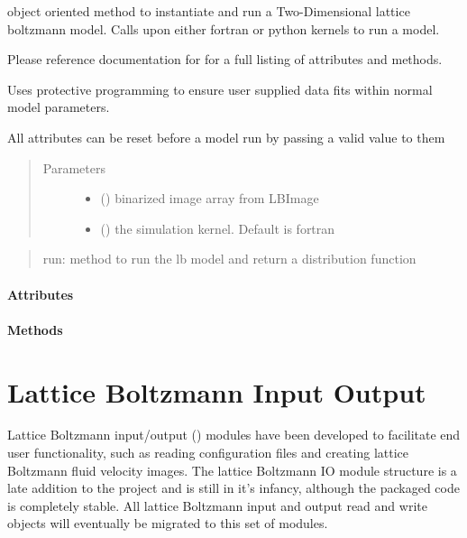 \documentclass[letterpaper,10pt,english]{sphinxmanual}
\begin{document}
\begin{fulllineitems}
\label{\detokenize{index:lb_colloids.LB2DModel}}
object oriented method to instantiate and run a Two-Dimensional
lattice boltzmann model. Calls upon either fortran or python
kernels to run a model.

Please reference documentation for
for a full listing of attributes and methods.

Uses protective programming to ensure user supplied data fits within normal model
parameters.

All attributes can be reset before a model run by passing a valid value to them
\begin{quote}\begin{description}
\item[{Parameters}] \leavevmode\begin{itemize}
\item {} 
 () \textendash{} binarized image array from LBImage

\item {} 
 () \textendash{} the simulation kernel. Default is fortran

\end{itemize}

\end{description}\end{quote}
\begin{quote}

run:  method to run the lb model and return a distribution function
\end{quote}
\paragraph{Attributes}
\paragraph{Methods}

\end{fulllineitems}



\section{Lattice Boltzmann Input Output}
\label{\detokenize{index:lattice-boltzmann-input-output}}
Lattice Boltzmann input/output () modules have been developed to facilitate end user functionality, such as reading configuration files and creating lattice Boltzmann fluid velocity images. The lattice Boltzmann IO module structure is a late addition to the project and is still in it’s infancy, although the packaged code is completely stable. All lattice Boltzmann input and output read and write objects will  eventually be migrated to this set of modules.
\end{document}
